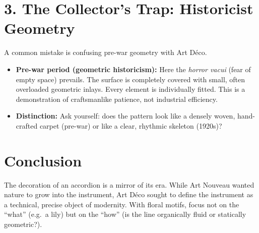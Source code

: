 \documentclass[11pt,a4paper]{article}
\begin{document}
	\section*{3. The Collector's Trap: Historicist Geometry}
	A common mistake is confusing pre-war geometry with Art D\'eco.

	\begin{itemize}
		\item \textbf{Pre-war period (geometric historicism):} Here the \textit{horror vacui} (fear of empty space) prevails. The surface is completely covered with small, often overloaded geometric inlays. Every element is individually fitted. This is a demonstration of craftsmanlike patience, not industrial efficiency.
		\item \textbf{Distinction:} Ask yourself: does the pattern look like a densely woven, hand-crafted carpet (pre-war) or like a clear, rhythmic skeleton (1920s)?
	\end{itemize}

	\section*{Conclusion}
	The decoration of an accordion is a mirror of its era. While Art Nouveau wanted nature to grow into the instrument, Art D\'eco sought to define the instrument as a technical, precise object of modernity. With floral motifs, focus not on the ``what'' (e.g.\ a lily) but on the ``how'' (is the line organically fluid or statically geometric?).
\end{document}
